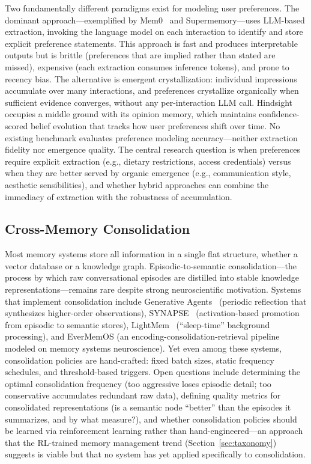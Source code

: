 Two fundamentally different paradigms exist for modeling user
preferences. The dominant approach---exemplified by
Mem0~\cite{choudhary2025mem0} and Supermemory---uses LLM-based
extraction, invoking the language model on each interaction to
identify and store explicit preference statements. This approach is
fast and produces interpretable outputs but is brittle (preferences
that are implied rather than stated are missed), expensive (each
extraction consumes inference tokens), and prone to recency bias.
The alternative is emergent crystallization: individual impressions
accumulate over many interactions, and preferences crystallize
organically when sufficient evidence converges, without any
per-interaction LLM call. Hindsight~\cite{latimer2025hindsight}
occupies a middle ground with its opinion memory, which maintains
confidence-scored belief evolution that tracks how user preferences
shift over time. No existing benchmark evaluates preference modeling
accuracy---neither extraction fidelity nor emergence quality. The
central research question is when preferences require explicit
extraction (e.g., dietary restrictions, access credentials) versus
when they are better served by organic emergence (e.g., communication
style, aesthetic sensibilities), and whether hybrid approaches can
combine the immediacy of extraction with the robustness of
accumulation.

\subsection{Cross-Memory Consolidation}

Most memory systems store all information in a single flat structure,
whether a vector database or a knowledge graph. Episodic-to-semantic
consolidation---the process by which raw conversational episodes are
distilled into stable knowledge representations---remains rare
despite strong neuroscientific motivation. Systems that implement
consolidation include Generative
Agents~\cite{park2023generative} (periodic reflection that
synthesizes higher-order observations),
SYNAPSE~\cite{jiang2026synapse} (activation-based promotion from
episodic to semantic stores),
LightMem~\cite{fang2025lightmem} (``sleep-time'' background
processing), and EverMemOS (an encoding-consolidation-retrieval
pipeline modeled on memory systems neuroscience). Yet even among
these systems, consolidation policies are hand-crafted: fixed batch
sizes, static frequency schedules, and threshold-based triggers.
Open questions include determining the optimal consolidation frequency
(too aggressive loses episodic detail; too conservative accumulates
redundant raw data), defining quality metrics for consolidated
representations (is a semantic node ``better'' than the episodes it
summarizes, and by what measure?), and whether consolidation policies
should be learned via reinforcement learning rather than
hand-engineered---an approach that the RL-trained memory management
trend (Section~\ref{sec:taxonomy}) suggests is viable but that no
system has yet applied specifically to consolidation.

